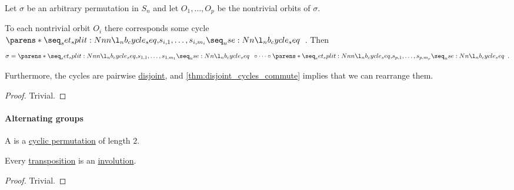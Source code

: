 \begin{proposition}\label{thm:permutation_decomposition_into_disjoint_cycles}
  Let \( \sigma \) be an arbitrary permutation in \( S_n \) and let \( O_1, \ldots, O_p \) be the nontrivial orbits of \( \sigma \).

  To each nontrivial orbit \( O_i \) there corresponds some cycle \( \cycle{ s_{i,1}, \ldots, s_{i,m_i} } \). Then
  \begin{equation*}
    \sigma = \cycle{ s_{1,1}, \ldots, s_{1,m_1} } \bincirc \cdots \bincirc \cycle{ s_{p,1}, \ldots, s_{p,m_p} }.
  \end{equation*}

  Furthermore, the cycles are pairwise \hyperref[def:disjoint_cycle]{disjoint}, and \cref{thm:disjoint_cycles_commute} implies that we can rearrange them.
\end{proposition}
\begin{proof}
  Trivial.
\end{proof}

\paragraph{Alternating groups}

\begin{definition}\label{def:transposition}
  A  is a \hyperref[def:cyclic_permutation]{cyclic permutation} of length \( 2 \).
\end{definition}

\begin{proposition}\label{thm:transpositions_are_involutions}
  Every \hyperref[def:transposition]{transposition} is an \hyperref[def:morphism_invertibility/involution]{involution}.
\end{proposition}
\begin{proof}
  Trivial.
\end{proof}

